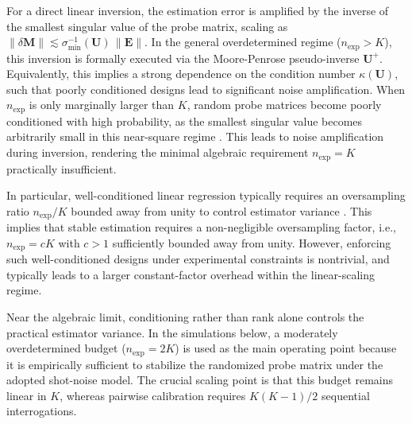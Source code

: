 \documentclass[a4paper,twocolumn,11pt]{quantumarticle}
\begin{document}
For a direct linear inversion, the estimation error is amplified by the inverse of the smallest singular value of the probe matrix, scaling as $\|\delta \mathbf{M}\| \lesssim \sigma_{\min}^{-1}(\mathbf{U}) \, \|\mathbf{E}\|$. In the general overdetermined regime ($n_{\text{exp}} > K$), this inversion is formally executed via the Moore-Penrose pseudo-inverse $\mathbf{U}^+$. Equivalently, this implies a strong dependence on the condition number $\kappa(\mathbf{U})$, such that poorly conditioned designs lead to significant noise amplification. When $n_{\text{exp}}$ is only marginally larger than $K$, random probe matrices become poorly conditioned with high probability, as the smallest singular value becomes arbitrarily small in this near-square regime \cite{vershynin_high-dimensional_2018}. This leads to noise amplification during inversion, rendering the minimal algebraic requirement $n_{\text{exp}} = K$ practically insufficient.

In particular, well-conditioned linear regression typically requires an oversampling ratio $n_{\text{exp}}/K$ bounded away from unity to control estimator variance \cite{hastie_elements_2009}. This implies that stable estimation requires a non-negligible oversampling factor, i.e., $n_{\text{exp}} = cK$ with $c > 1$ sufficiently bounded away from unity. However, enforcing such well-conditioned designs under experimental constraints is nontrivial, and typically leads to a larger constant-factor overhead within the linear-scaling regime.

Near the algebraic limit, conditioning rather than rank alone controls the practical estimator variance. In the simulations below, a moderately overdetermined budget ($n_{\text{exp}}=2K$) is used as the main operating point because it is empirically sufficient to stabilize the randomized probe matrix under the adopted shot-noise model. The crucial scaling point is that this budget remains linear in $K$, whereas pairwise calibration requires $K(K-1)/2$ sequential interrogations.
\end{document}
